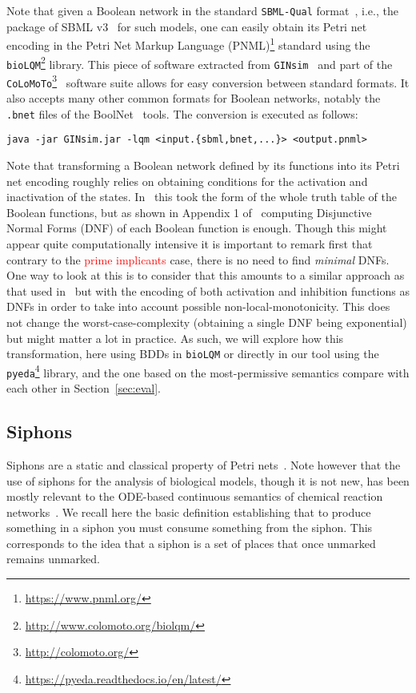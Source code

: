 \documentclass[preprint,12pt]{elsarticle}
\newcommand{\change}[1]{\textcolor{red}{#1}}
\begin{document}
Note that given a Boolean network in the standard \texttt{SBML-Qual} format~\cite{chaouiya2013sbml}, i.e., the package of SBML v3~\cite{keating2020sbml} for such models, one can easily obtain its Petri net encoding in the Petri Net Markup Language  (PNML)\footnote{\url{https://www.pnml.org/}} standard using the \texttt{bioLQM}\footnote{\url{http://www.colomoto.org/biolqm/}} library.
This piece of software extracted from \texttt{GINsim}~\cite{chaouiya2012logical} and part of the \texttt{CoLoMoTo}\footnote{\url{http://colomoto.org/}}~\cite{naldi2015cooperative} software suite allows for easy conversion between standard formats.
It also accepts many other common formats for Boolean networks, notably the \verb|.bnet| files of the  BoolNet~\cite{mussel2010boolnet,klarner2017pyboolnet} tools.
The conversion is executed as follows:

{\small \verb|java -jar GINsim.jar -lqm <input.{sbml,bnet,...}> <output.pnml>|}

Note that transforming a Boolean network defined by its functions into its Petri net encoding roughly relies on obtaining conditions for the activation and inactivation of the states. In~\cite{chaouiya2004qualitative} this took the form of the whole truth table of the Boolean functions, but as shown in Appendix 1 of~\cite{chatain2014characterization} computing Disjunctive Normal Forms (DNF) of each Boolean function is enough.
Though this might appear quite computationally intensive it is important to remark first that contrary to the \change{prime implicants} case, there is no need to find \emph{minimal} DNFs.
One way to look at this is to consider that this amounts to a similar approach as that used in~\cite{DBLP:conf/ictai/ChevalierFPZ19} but with the encoding of both activation and inhibition functions as DNFs in order to take into account possible non-local-monotonicity.
This does not change the worst-case-complexity (obtaining a single DNF being exponential) but might matter a lot in practice.
As such, we will explore how this transformation, here using BDDs in \texttt{bioLQM} or directly in our tool using the \texttt{pyeda}\footnote{\url{https://pyeda.readthedocs.io/en/latest/}} library, and the one based on the most-permissive semantics compare with each other in Section~\ref{sec:eval}.


\subsection{Siphons}

Siphons are a static and classical property of Petri nets~\cite{peterson1981petri}.
Note however that the use of siphons for the analysis of biological models, though it is not new, has been mostly relevant to the ODE-based continuous semantics of chemical reaction networks~\cite{angeli2007petri,angeli2011persistence,degrand2020graphical}.
We recall here the basic definition establishing that to produce something in a siphon you must consume something from the siphon.
This corresponds to the idea that a siphon is a set of places that once unmarked remains unmarked.
\end{document}
